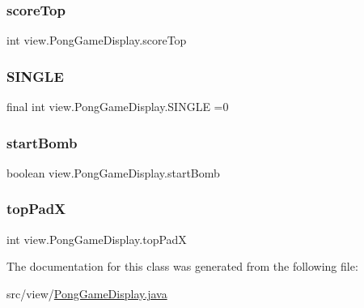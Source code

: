 \hypertarget{classview_1_1_pong_game_display_a14bdd6ada555582531723e7c11784251}{}\label{classview_1_1_pong_game_display_a14bdd6ada555582531723e7c11784251} 
\subsubsection{\texorpdfstring{score\+Top}{scoreTop}}
{\footnotesize\ttfamily int view.\+Pong\+Game\+Display.\+score\+Top\hspace{0.3cm}{\ttfamily [private]}}

\hypertarget{classview_1_1_pong_game_display_a8d4dbbd4e9ba52b12ba951899c7fe02d}{}\label{classview_1_1_pong_game_display_a8d4dbbd4e9ba52b12ba951899c7fe02d} 
\subsubsection{\texorpdfstring{S\+I\+N\+G\+LE}{SINGLE}}
{\footnotesize\ttfamily final int view.\+Pong\+Game\+Display.\+S\+I\+N\+G\+LE =0\hspace{0.3cm}{\ttfamily [private]}}

\hypertarget{classview_1_1_pong_game_display_a4acf14f2571c372dd4737fac2b8d7412}{}\label{classview_1_1_pong_game_display_a4acf14f2571c372dd4737fac2b8d7412} 
\subsubsection{\texorpdfstring{start\+Bomb}{startBomb}}
{\footnotesize\ttfamily boolean view.\+Pong\+Game\+Display.\+start\+Bomb\hspace{0.3cm}{\ttfamily [private]}}

\hypertarget{classview_1_1_pong_game_display_a808ad12c167de880ca74e5ad56ea5f43}{}\label{classview_1_1_pong_game_display_a808ad12c167de880ca74e5ad56ea5f43} 
\subsubsection{\texorpdfstring{top\+PadX}{topPadX}}
{\footnotesize\ttfamily int view.\+Pong\+Game\+Display.\+top\+PadX\hspace{0.3cm}{\ttfamily [private]}}



The documentation for this class was generated from the following file\+:\begin{DoxyCompactItemize}
\item 
src/view/\hyperlink{_pong_game_display_8java}{Pong\+Game\+Display.\+java}\end{DoxyCompactItemize}
